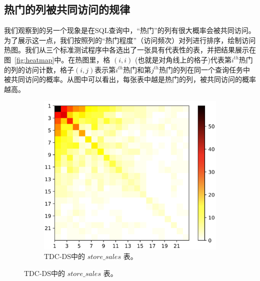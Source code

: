 \subsection{热门的列被共同访问的规律}
我们观察到的另一个现象是在SQL查询中，“热门”的列有很大概率会被共同访问。为了展示这一点，我们按照列的“热门程度”（访问频次）对列进行排序，绘制访问热图。我们从三个标准测试程序中各选出了一张具有代表性的表，并把结果展示在图~\ref{fig:heatmap}中。在热图里，格 $(i,i)$ (也就是对角线上的格子)代表第$i^{th}$热门的列的访问计数，格子$(i,j)$表示第$i^{th}$热门和第$j^{th}$热门的列在同一个查询任务中被共同访问的概率。从图中可以看出，每张表中越是热门的列，被共同访问的概率越高。

\begin{figure}[]
    \centering
    \begin{subfigure}[t]{0.5\textwidth}
        \centering
        \includegraphics[width=1\textwidth]{img/motivation/tpc-ds-store_sales}
        \caption{TDC-DS中的 $store\_sales$ 表。}
        \label{fig:ds_count_cdf}
    \end{subfigure}%


\end{figure}
